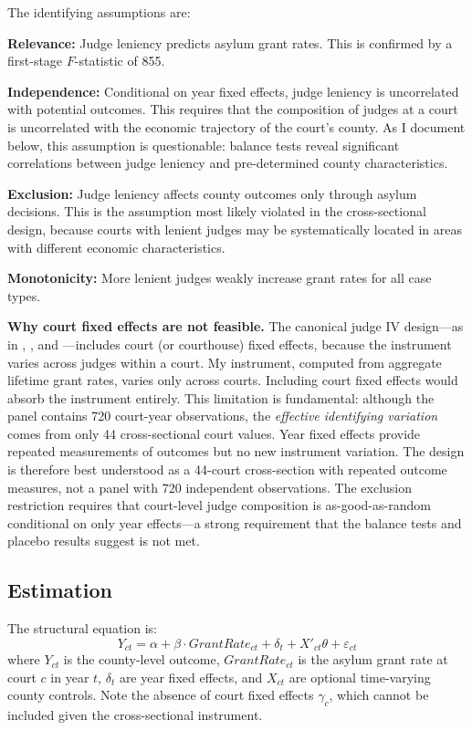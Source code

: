 \documentclass[12pt]{article}
\begin{document}
The identifying assumptions are:

\textbf{Relevance:} Judge leniency predicts asylum grant rates. This is confirmed by a first-stage $F$-statistic of 855.

\textbf{Independence:} Conditional on year fixed effects, judge leniency is uncorrelated with potential outcomes. This requires that the composition of judges at a court is uncorrelated with the economic trajectory of the court's county. As I document below, this assumption is questionable: balance tests reveal significant correlations between judge leniency and pre-determined county characteristics.

\textbf{Exclusion:} Judge leniency affects county outcomes only through asylum decisions. This is the assumption most likely violated in the cross-sectional design, because courts with lenient judges may be systematically located in areas with different economic characteristics.

\textbf{Monotonicity:} More lenient judges weakly increase grant rates for all case types.

\textbf{Why court fixed effects are not feasible.} The canonical judge IV design---as in \citet{kling2006incarceration}, \citet{dobbie2018effects}, and \citet{maestas2013does}---includes court (or courthouse) fixed effects, because the instrument varies across judges within a court. My instrument, computed from aggregate lifetime grant rates, varies only across courts. Including court fixed effects would absorb the instrument entirely. This limitation is fundamental: although the panel contains 720 court-year observations, the \textit{effective identifying variation} comes from only 44 cross-sectional court values. Year fixed effects provide repeated measurements of outcomes but no new instrument variation. The design is therefore best understood as a 44-court cross-section with repeated outcome measures, not a panel with 720 independent observations. The exclusion restriction requires that court-level judge composition is as-good-as-random conditional on only year effects---a strong requirement that the balance tests and placebo results suggest is not met.

\subsection{Estimation}

The structural equation is:
\begin{equation}
Y_{ct} = \alpha + \beta \cdot GrantRate_{ct} + \delta_t + X'_{ct}\theta + \varepsilon_{ct}
\label{eq:structural}
\end{equation}
where $Y_{ct}$ is the county-level outcome, $GrantRate_{ct}$ is the asylum grant rate at court $c$ in year $t$, $\delta_t$ are year fixed effects, and $X_{ct}$ are optional time-varying county controls. Note the absence of court fixed effects $\gamma_c$, which cannot be included given the cross-sectional instrument.
\end{document}
